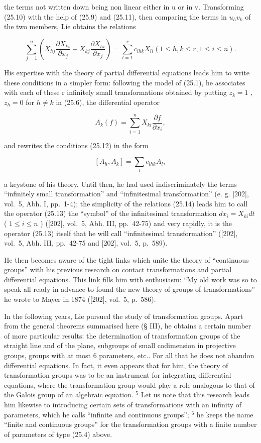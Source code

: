 the terms not written down being non linear either in u or in v. Transforming (25.10) with the help of (25.9) and (25.11), then comparing the terms in \(u_{h}v_{k}\) of the two members, Lie obtains the relations

\[
\sum_ {j = 1} ^ {n} \left(X _ {h j} \frac {\partial X _ {k i}}{\partial x _ {j}} - X _ {k j} \frac {\partial X _ {h i}}{\partial x _ {j}}\right) = \sum_ {l = 1} ^ {r} c _ {l h k} X _ {l i} (1 \leq h, k \leq r, 1 \leq i \leq n).\tag{25.12}
\]

His expertise with the theory of partial differential equations leads him to write these conditions in a simpler form: following the model of (25.1), he associates with each of these r infinitely small transformations obtained by putting \(z_{k}=1\) , \(z_{h}=0\) for \(h\neq k\) in (25.6), the differential operator

\[
A _ {k} (f) = \sum_ {i = 1} ^ {n} X _ {k i} \frac {\partial f}{\partial x _ {i}},\tag{25.13}
\]

and rewrites the conditions (25.12) in the form

\[
[ A _ {h}, A _ {k} ] = \sum_ {l} c _ {l h k} A _ {l},\tag{25.14}
\]

a keystone of his theory. Until then, he had used indiscriminately the terms ``infinitely small transformation'' and ``infinitesimal transformation'' (e. g. {[}202{]}, vol.~5, Abh. I, pp.~1-4); the simplicity of the relations (25.14) leads him to call the operator (25.13) the ``symbol'' of the infinitesimal transformation \(dx_{i} = X_{ki}dt\) ( \(1 \leq i \leq n\) ) ({[}202{]}, vol.~5, Abh. III, pp.~42-75) and very rapidly, it is the operator (25.13) itself that he will call ``infinitesimal transformation'' ({[}202{]}, vol.~5, Abh. III, pp.~42-75 and {[}202{]}, vol.~5, p.~589).

He then becomes aware of the tight links which unite the theory of ``continuous groups'' with his previous research on contact transformations and partial differential equations. This link fills him with enthusiasm: ``My old work was so to speak all ready in advance to found the new theory of groups of transformations'' he wrote to Mayer in 1874 ({[}202{]}, vol.~5, p.~586).

In the following years, Lie pursued the study of transformation groups. Apart from the general theorems summarised here (§ III), he obtains a certain number of more particular results: the determination of transformation groups of the straight line and of the plane, subgroups of small codimension in projective groups, groups with at most 6 parameters, etc.. For all that he does not abandon differential equations. In fact, it even appears that for him, the theory of transformation groups was to be an instrument for integrating differential equations, where the transformation group would play a role analogous to that of the Galois group of an algebraic equation. \(^{5}\) Let us note that this research leads him likewise to introducing certain sets of transformations with an infinity of parameters, which he calls ``infinite and continuous groups''; \(^{6}\) he keeps the name ``finite and continuous groups'' for the transformation groups with a finite number of parameters of type (25.4) above.

